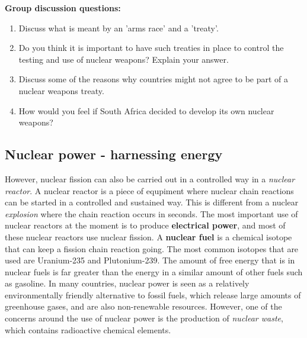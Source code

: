 {\textbf{Group discussion questions:\\}

\begin{enumerate}
\item{Discuss what is meant by an 'arms race' and a 'treaty'.}
\item{Do you think it is important to have such treaties in place to control the testing and use of nuclear weapons? Explain your answer.}
\item{Discuss some of the reasons why countries might not agree to be part of a nuclear weapons treaty.}
\item{How would you feel if South Africa decided to develop its own nuclear weapons?}
\end{enumerate}
}

\subsection{Nuclear power - harnessing energy}
\label{subsec:an:nfiss:power}

However, nuclear fission can also be carried out in a controlled way in a \textit{nuclear reactor}. A nuclear reactor is a piece of equpiment where nuclear chain reactions can be started in a controlled and sustained way. This is different from a nuclear \textit{explosion} where the chain reaction occurs in seconds. The most important use of nuclear reactors at the moment is to produce \textbf{electrical power}, and most of these nuclear reactors use nuclear fission. A \textbf{nuclear fuel} is a chemical isotope that can keep a fission chain reaction going. The most common isotopes that are used are Uranium-235 and Plutonium-239. The amount of free energy that is in nuclear fuels is far greater than the energy in a similar amount of other fuels such as gasoline. In many countries, nuclear power is seen as a relatively environmentally friendly alternative to fossil fuels, which release large amounts of greenhouse gases, and are also non-renewable resources. However, one of the concerns around the use of nuclear power is the production of \textit{nuclear waste}, which contains radioactive chemical elements. 

